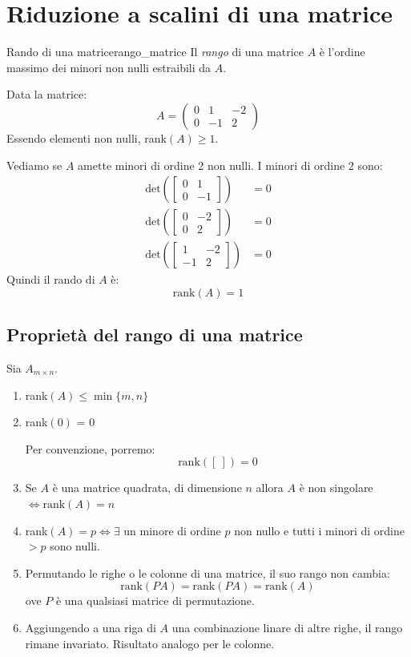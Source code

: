 \documentclass[12pt]{report}
\newcounter{definition}
\newcommand{\nmu}{}
\begin{document}
\section{Riduzione a scalini di una matrice}
\begin{definition}{\nmu Rando di una matrice}{rango_matrice}
	Il \textit{rango} di una matrice $A$ è l'ordine massimo dei minori non nulli estraibili da $A$.
\end{definition}
\begin{example}{}{}
Data la matrice:
\[
A = \begin{pmatrix}
	0 & 1 & -2 \\
	0 & -1 & 2
\end{pmatrix}
\]
Essendo elementi non nulli, rank$(A) \geq 1$.

Vediamo se $A$ amette minori di ordine 2 non nulli. I minori di ordine 2 sono:
\begin{align*}
	\text{det}\left(\begin{bmatrix}
		0 & 1 \\
		0 & -1
	\end{bmatrix}\right) &= 0 \\
	\text{det}\left(\begin{bmatrix}
		0 & -2 \\
		0 & 2
	\end{bmatrix}\right) &= 0 \\
	\text{det}\left(\begin{bmatrix}
		1 & -2 \\
		-1 & 2
	\end{bmatrix}\right) &= 0
\end{align*}
Quindi il rando di $A$ è:
\[
\text{rank}(A) = 1
\]
\end{example}
\subsection{Proprietà del rango di una matrice} Sia $A_{m\times n}$.
\begin{enumerate}
	\item rank$(A) \leq \min\{m, n\}$
	\item rank$(0)$ = 0

	Per convenzione, porremo:
	\[
	\text{rank}([\ ]) = 0
	\]
	\item Se $A$ è una matrice quadrata, di dimensione $n$ allora $A$ è non singolare $\iff \text{rank}(A) = n$
	\item rank$(A) = p\iff \exists$ un minore di ordine $p$ non nullo e tutti i minori di ordine $> p$ sono nulli.
	\item Permutando le righe o le colonne di una matrice, il suo rango non cambia:
	\[
	\text{rank}(PA) = \text{rank}(PA) = \text{rank}(A)
	\]
	ove $P$ è una qualsiasi matrice di permutazione.
	\item Aggiungendo a una riga di $A$ una combinazione linare di altre righe, il rango rimane invariato. Risultato analogo per le colonne.
\end{enumerate}
\end{document}
